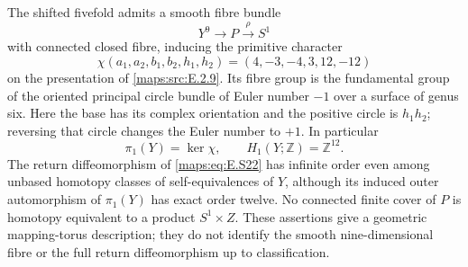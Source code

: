 \begin{theorem}\label{maps:src:E.2.13}


The shifted fivefold admits a smooth fibre bundle
\[
                  Y^9\longrightarrow P\stackrel{\rho}{\longrightarrow}S^1
 \tag{E.S22}\label{maps:eq:E.S22}
\]
with connected closed fibre, inducing the primitive character
\[
 \chi(a_1,a_2,b_1,b_2,h_1,h_2)
                    =(4,-3,-4,3,12,-12)
 \tag{E.S23}\label{maps:eq:E.S23}
\]
on the presentation of \ref{maps:src:E.2.9}. Its fibre group is the fundamental
group of the oriented principal circle bundle of Euler number
$-1$ over a surface of genus six. Here the base has its complex
orientation and the positive circle is $h_1h_2$; reversing that
circle changes the Euler number to $+1$. In particular
\[
 \pi_1(Y)=\ker\chi,\qquad H_1(Y;\mathbb Z)=\mathbb Z^{12}.
 \tag{E.S24}\label{maps:eq:E.S24}
\]
The return diffeomorphism of \eqref{maps:eq:E.S22} has infinite order even
among unbased homotopy classes of self-equivalences of $Y$,
although its induced outer automorphism of $\pi_1(Y)$ has
exact order twelve. No connected finite cover of $P$ is
homotopy equivalent to a product $S^1\times Z$.
These assertions give a geometric mapping-torus description;
they do not identify the smooth nine-dimensional fibre or
the full return diffeomorphism up to classification.

\end{theorem}


